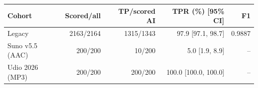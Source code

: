 \begin{tabular}{lrrrr}
\toprule
Cohort & Scored/all & TP/scored AI & TPR (\%) [95\% CI] & F1 \\
\midrule
Legacy & 2163/2164 & 1315/1343 & 97.9 [97.1, 98.7] & 0.9887 \\
Suno v5.5 (AAC) & 200/200 & 10/200 & 5.0 [1.9, 8.9] & -- \\
Udio 2026 (MP3) & 200/200 & 200/200 & 100.0 [100.0, 100.0] & -- \\
\bottomrule
\end{tabular}
